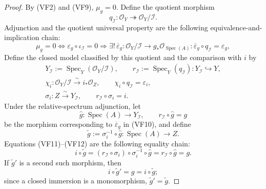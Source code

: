 \begin{proof}
  By (VF2) and (VF9), $\mu_g=0$.  Define the quotient morphism
  \[
    q_{\mathcal I}\colon\mathcal O_Y\twoheadrightarrow
      \mathcal O_Y/\mathcal I.
  \]
  Adjunction and the quotient universal property are the following
  equivalence-and-implication chain:
  \[
    \mu_g=0
      \Longleftrightarrow
        \varepsilon_g\circ\iota_{\mathcal I}=0
      \Longrightarrow
        \exists!\,\overline\varepsilon_g\colon
          \mathcal O_Y/\mathcal I\to
            g_*\mathcal O_{\operatorname{Spec}(A)}:
          \overline\varepsilon_g\circ q_{\mathcal I}=\varepsilon_g,
                                                                    \tag{VF10}
  \]
  Define the closed model classified by this quotient and the comparison
  with $i$ by
  \[
  \begin{gathered}
    Y_{\mathcal I}:=\operatorname{Spec}_Y(\mathcal O_Y/\mathcal I),
    \qquad
    r_{\mathcal I}:=\operatorname{Spec}_Y(q_{\mathcal I})
      \colon Y_{\mathcal I}\hookrightarrow Y,\\
    \chi_i\colon\mathcal O_Y/\mathcal I
      \xrightarrow{\sim}i_*\mathcal O_Z,
    \qquad
    \chi_i\circ q_{\mathcal I}=\varepsilon_i,\\
    \sigma_i\colon Z\xrightarrow{\sim}Y_{\mathcal I},
    \qquad r_{\mathcal I}\circ\sigma_i=i.
  \end{gathered}                                                   \tag{VF11}
  \]
  Under the relative-spectrum adjunction, let
  \[
    \widehat g\colon\operatorname{Spec}(A)\to Y_{\mathcal I},
    \qquad r_{\mathcal I}\circ\widehat g=g                     \tag{VF12}
  \]
  be the morphism corresponding to $\overline\varepsilon_g$ in (VF10), and
  define
  \[
    \widetilde g:=\sigma_i^{-1}\circ\widehat g
      \colon\operatorname{Spec}(A)\to Z.
  \]
  Equations (VF11)--(VF12) are the following equality chain:
  \[
    i\circ\widetilde g
      =(r_{\mathcal I}\circ\sigma_i)\circ
        \sigma_i^{-1}\circ\widehat g
      =r_{\mathcal I}\circ\widehat g=g.                         \tag{VF13}
  \]
  If $\widetilde g'$ is a second such morphism, then
  \[
    i\circ\widetilde g'=g=i\circ\widetilde g;
  \]
  since a closed immersion is a monomorphism,
  $\widetilde g'=\widetilde g$.
\end{proof}

